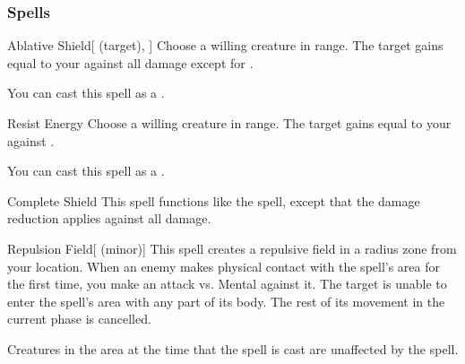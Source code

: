 \subsubsection{Spells}


\lowercase{\hypertarget{spell:Ablative Shield}{}}\label{spell:Ablative Shield}
\begin{ability}[\nth{1}]{\hypertarget{spell:Ablative Shield}{Ablative Shield}}[ (target), ]
Choose a willing creature in \rngclose range.
The target gains  equal to your  against all damage except for .

You can cast this spell as a .
\end{ability}
\vspace{0.25em}



\lowercase{\hypertarget{spell:Resist Energy}{}}\label{spell:Resist Energy}
\begin{ability}[\nth{1}]{\hypertarget{spell:Resist Energy}{Resist Energy}}
Choose a willing creature in \rngclose range.
The target gains  equal to your  against .

You can cast this spell as a .
\end{ability}
\vspace{0.25em}



\lowercase{\hypertarget{spell:Complete Shield}{}}\label{spell:Complete Shield}
\begin{ability}[\nth{2}]{\hypertarget{spell:Complete Shield}{Complete Shield}}
This spell functions like the  spell, except that the damage reduction applies against all damage.
\end{ability}
\vspace{0.25em}



\lowercase{\hypertarget{spell:Repulsion Field}{}}\label{spell:Repulsion Field}
\begin{ability}[\nth{2}]{\hypertarget{spell:Repulsion Field}{Repulsion Field}}[ (minor)]
This spell creates a repulsive field in a \areamed radius zone from your location.
When an enemy makes physical contact with the spell's area for the first time, you make an attack vs. Mental against it.
\hit The target is unable to enter the spell's area with any part of its body.
The rest of its movement in the current phase is cancelled.

Creatures in the area at the time that the spell is cast are unaffected by the spell.
\end{ability}
\vspace{0.25em}



